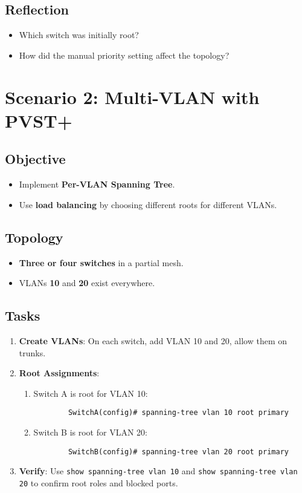 \documentclass[a4paper]{report}
\begin{document}
\subsection{Reflection}
\begin{itemize}
    \item Which switch was initially root?
    \item How did the manual priority setting affect the topology?
\end{itemize}

\section{Scenario 2: Multi-VLAN with PVST+}
\subsection{Objective}
\begin{itemize}
    \item Implement \textbf{Per-VLAN Spanning Tree}.
    \item Use \textbf{load balancing} by choosing different roots for different VLANs.
\end{itemize}

\subsection{Topology}
\begin{itemize}
    \item \textbf{Three or four switches} in a partial mesh.
    \item VLANs \textbf{10} and \textbf{20} exist everywhere.
\end{itemize}

\subsection{Tasks}
\begin{enumerate}
    \item \textbf{Create VLANs}: On each switch, add VLAN 10 and 20, allow them on trunks.
    \item \textbf{Root Assignments}:
    \begin{enumerate}
        \item Switch A is root for VLAN 10:
        \begin{lstlisting}
        SwitchA(config)# spanning-tree vlan 10 root primary
        \end{lstlisting}
        \item Switch B is root for VLAN 20:
        \begin{lstlisting}
        SwitchB(config)# spanning-tree vlan 20 root primary
        \end{lstlisting}
    \end{enumerate}
    \item \textbf{Verify}: Use \texttt{show spanning-tree vlan 10} and \texttt{show spanning-tree vlan 20} to confirm root roles and blocked ports.
\end{enumerate}
\end{document}
